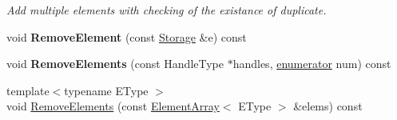 \begin{DoxyCompactItemize}
\begin{DoxyCompactList}\small\item\em Add multiple elements with checking of the existance of duplicate. \end{DoxyCompactList}\item 
\hypertarget{classINMOST_1_1ElementSet_ab065f848f9feaa2aedd6214525e019f8}{void {\bfseries Remove\-Element} (const \hyperlink{classINMOST_1_1Storage}{Storage} \&e) const }\label{classINMOST_1_1ElementSet_ab065f848f9feaa2aedd6214525e019f8}

\item 
\hypertarget{classINMOST_1_1ElementSet_ac183d3760eef9515cfde84dd67847e03}{void {\bfseries Remove\-Elements} (const Handle\-Type $\ast$handles, \hyperlink{classINMOST_1_1Storage_ae333dfced6fa9cfde0c8e7dcf1b0cc2b}{enumerator} num) const }\label{classINMOST_1_1ElementSet_ac183d3760eef9515cfde84dd67847e03}

\item 
\hypertarget{classINMOST_1_1ElementSet_a119169cdf12afbca790ba53169e74af0}{{\footnotesize template$<$typename E\-Type $>$ }\\void \hyperlink{classINMOST_1_1ElementSet_a119169cdf12afbca790ba53169e74af0}{Remove\-Elements} (const \hyperlink{classINMOST_1_1ElementArray}{Element\-Array}$<$ E\-Type $>$ \&elems) const }\label{classINMOST_1_1ElementSet_a119169cdf12afbca790ba53169e74af0}


\end{DoxyCompactItemize}

